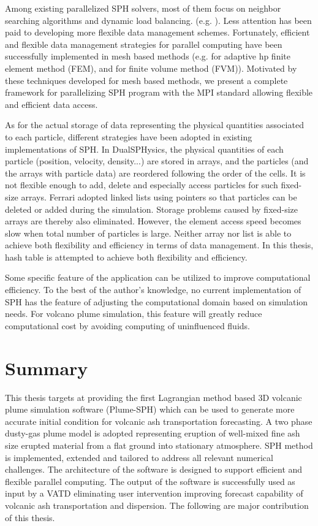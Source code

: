 Among existing parallelized SPH solvers, most of them focus on neighbor searching algorithms and dynamic load balancing. (e.g. \cite{ferrari2009new, crespo2015dualsphysics}). Less attention has been paid to developing more flexible data management schemes.
Fortunately, efficient and flexible data management strategies for parallel computing have been successfully implemented in mesh based methods (e.g. \cite{laszloffy2000simple} for adaptive hp finite element method (FEM), and \cite{patra2005parallel} for finite volume method (FVM)). Motivated by these techniques developed for mesh based methods, we present a complete framework for parallelizing SPH program with the MPI standard allowing flexible and efficient data access.

As for the actual storage of data representing the physical quantities associated to each particle, different strategies have been adopted in existing implementations of SPH. 
In DualSPHysics\cite{crespo2015dualsphysics}, the physical quantities of each particle (position, velocity, density...) are stored in arrays, and the particles (and the arrays with particle data) are reordered following the order of the cells. It is not flexible enough to add, delete and especially access particles for such fixed-size arrays. Ferrari\cite{ferrari2009new} adopted linked lists using pointers so that particles can be deleted or added during the simulation. Storage problems caused by fixed-size arrays are thereby also eliminated. However, the element access speed becomes slow when total number of particles is large. Neither array nor list is able to achieve both flexibility and efficiency in terms of data management. In this thesis, hash table is attempted to achieve both flexibility and efficiency.

Some specific feature of the application can be utilized to improve computational efficiency. To the best of the author's knowledge, no current implementation of SPH has the feature of adjusting the computational domain based on simulation needs. For volcano plume simulation, this feature will greatly reduce computational cost by avoiding computing of uninfluenced fluids.

\section{Summary}
This thesis targets at providing the first Lagrangian method based 3D volcanic plume simulation software (Plume-SPH) which can be used to generate more accurate initial condition for volcanic ash transportation forecasting. A two phase dusty-gas plume model is adopted representing eruption of well-mixed fine ash size erupted material from a flat ground into stationary atmosphere. SPH method is implemented, extended and tailored to address all relevant numerical challenges. The architecture of the software is designed to support efficient and flexible parallel computing. The output of the software is successfully used as input by a VATD eliminating user intervention improving forecast capability of volcanic ash transportation and dispersion. The following are major contribution of this thesis.

